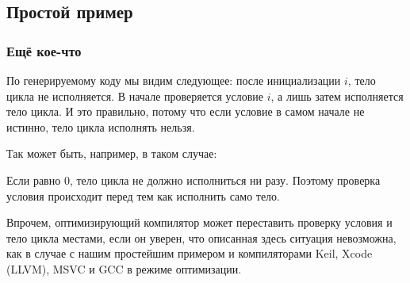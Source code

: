 \subsection{Простой пример}





\subsubsection{Ещё кое-что}

По генерируемому коду мы видим следующее: после инициализации $i$, тело цикла не исполняется.
В начале проверяется условие $i$, а лишь затем исполняется тело цикла.
И это правильно, потому что если условие в самом начале не истинно, тело цикла исполнять нельзя.

Так может быть, например, в таком случае:



Если  равно 0,
тело цикла не должно исполниться ни разу.
Поэтому проверка условия происходит перед тем как исполнить само тело.

Впрочем, оптимизирующий компилятор может переставить проверку условия и тело цикла местами, если он уверен,
что описанная здесь ситуация невозможна, как в случае с нашим простейшим примером и компиляторами 
Keil, Xcode (LLVM), MSVC и GCC в режиме оптимизации.

